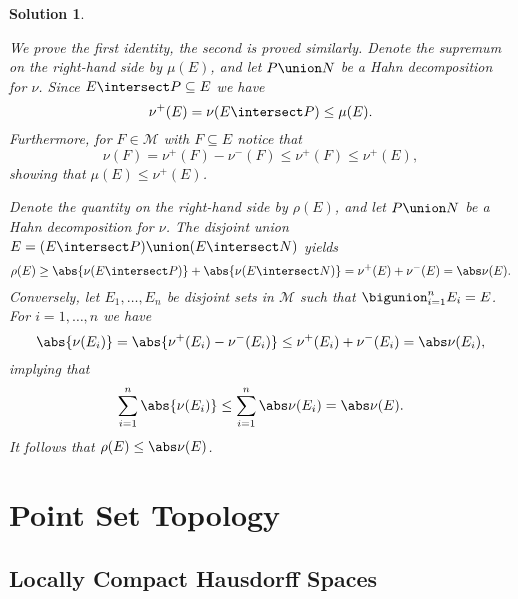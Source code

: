 \documentclass[article, a4paper, 11pt, oneside]{memoir}
\numberwithin{equation}{chapter}
\newcommand{\calM}{\mathcal{M}}
\theoremstyle{nonumberplain}
\newtheorem{solution}{Solution}
\begin{document}
\begin{solution}
\begin{solutionsec}
	\item We prove the first identity, the second is proved similarly. Denote the supremum on the right-hand side by $\mu(E)$, and let $P \union N$ be a Hahn decomposition for $\nu$. Since $E \intersect P \subseteq E$ we have
	\begin{equation*}
		\nu^+(E)
			= \nu(E \intersect P)
			\leq \mu(E).
	\end{equation*}
	Furthermore, for $F \in \calM$ with $F \subseteq E$ notice that
	\begin{equation*}
		\nu(F)
			= \nu^+(F) - \nu^-(F)
			\leq \nu^+(F)
			\leq \nu^+(E),
	\end{equation*}
	showing that $\mu(E) \leq \nu^+(E)$.

	\item Denote the quantity on the right-hand side by $\rho(E)$, and let $P \union N$ be a Hahn decomposition for $\nu$. The disjoint union $E = (E \intersect P) \union (E \intersect N)$ yields
	\begin{equation*}
		\rho(E)
			\geq \abs{\nu(E \intersect P)} + \abs{\nu(E \intersect N)}
			= \nu^+(E) + \nu^-(E)
			= \abs\nu(E). 
	\end{equation*}
	Conversely, let $E_1, \ldots, E_n$ be disjoint sets in $\calM$ such that $\bigunion_{i=1}^n E_i = E$. For $i = 1, \ldots, n$ we have
	\begin{equation*}
		\abs{\nu(E_i)}
			= \abs{ \nu^+(E_i) - \nu^-(E_i) }
			\leq \nu^+(E_i) + \nu^-(E_i)
			= \abs\nu(E_i),
	\end{equation*}
	implying that
	\begin{equation*}
		\sum_{i=1}^n \abs{\nu(E_i)}
			\leq \sum_{i=1}^n \abs\nu(E_i)
			= \abs\nu(E).
	\end{equation*}
	It follows that $\rho(E) \leq \abs\nu(E)$.
\end{solutionsec}
\end{solution}


\chapter{Point Set Topology}

\setcounter{section}{4}
\section{Locally Compact Hausdorff Spaces}
\end{document}
